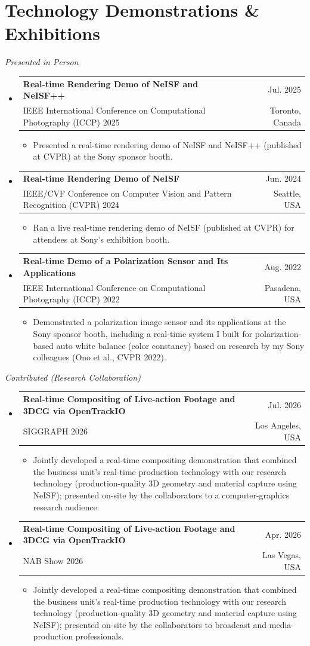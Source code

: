 \documentclass[a4paper,11pt]{article}
\makeatletter
\newcommand{\CVItem}[1]{
  \item\small{
    {#1 \vspace{-2pt}}
  }
}
\newcommand{\CVSubheading}[4]{
  \vspace{-2pt}\item
    \begin{tabular*}{0.97\textwidth}[t]{l@{\extracolsep{\fill}}r}
      \textbf{#1} & #2 \\
      \small#3 & \small #4 \\
    \end{tabular*}\vspace{-7pt}
}
\newcommand{\CVSubHeadingListStart}{\begin{itemize}[leftmargin=0.5cm, label={}]}
\newcommand{\CVSubHeadingListEnd}{\end{itemize}}
\newcommand{\CVItemListStart}{\begin{itemize}}
\newcommand{\CVItemListEnd}{\end{itemize}\vspace{-5pt}}
\makeatother
\begin{document}
\section{Technology Demonstrations \& Exhibitions}
 {\small\textit{Presented in Person}}
  \CVSubHeadingListStart
    \CVSubheading
      {Real-time Rendering Demo of NeISF and NeISF++}{Jul. 2025}
      {IEEE International Conference on Computational Photography (ICCP) 2025}{Toronto, Canada}
      \CVItemListStart
        \CVItem{Presented a real-time rendering demo of NeISF and NeISF++ (published at CVPR) at the Sony sponsor booth.}
      \CVItemListEnd
    \CVSubheading
      {Real-time Rendering Demo of NeISF}{Jun. 2024}
      {IEEE/CVF Conference on Computer Vision and Pattern Recognition (CVPR) 2024}{Seattle, USA}
      \CVItemListStart
        \CVItem{Ran a live real-time rendering demo of NeISF (published at CVPR) for attendees at Sony's exhibition booth.}
      \CVItemListEnd
    \CVSubheading
      {Real-time Demo of a Polarization Sensor and Its Applications}{Aug. 2022}
      {IEEE International Conference on Computational Photography (ICCP) 2022}{Pasadena, USA}
      \CVItemListStart
        \CVItem{Demonstrated a polarization image sensor and its applications at the Sony sponsor booth, including a real-time system I built for polarization-based auto white balance (color constancy) based on research by my Sony colleagues (Ono et al., CVPR 2022).}
      \CVItemListEnd
  \CVSubHeadingListEnd
 \vspace{3pt}
 {\small\textit{Contributed (Research Collaboration)}}
  \CVSubHeadingListStart
    \CVSubheading
      {Real-time Compositing of Live-action Footage and 3DCG via OpenTrackIO}{Jul. 2026}
      {SIGGRAPH 2026}{Los Angeles, USA}
      \CVItemListStart
        \CVItem{Jointly developed a real-time compositing demonstration that combined the business unit's real-time production technology with our research technology (production-quality 3D geometry and material capture using NeISF); presented on-site by the collaborators to a computer-graphics research audience.}
      \CVItemListEnd
    \CVSubheading
      {Real-time Compositing of Live-action Footage and 3DCG via OpenTrackIO}{Apr. 2026}
      {NAB Show 2026}{Las Vegas, USA}
      \CVItemListStart
        \CVItem{Jointly developed a real-time compositing demonstration that combined the business unit's real-time production technology with our research technology (production-quality 3D geometry and material capture using NeISF); presented on-site by the collaborators to broadcast and media-production professionals.}
      \CVItemListEnd
  \CVSubHeadingListEnd
\end{document}
